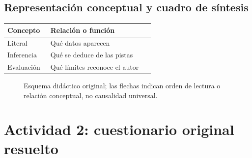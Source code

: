 \subsection{Representación conceptual y cuadro de síntesis}
\begin{longtable}{p{0.27\linewidth}p{0.65\linewidth}}
\toprule Concepto & Relación o función\\\midrule
Literal & Qué datos aparecen\\
Inferencia & Qué se deduce de las pistas\\
Evaluación & Qué límites reconoce el autor\\
\bottomrule
\end{longtable}
\begin{figure}[htbp]
\centering
{}
\caption{Esquema didáctico original; las flechas indican orden de lectura o relación conceptual, no causalidad universal.}
\end{figure}
\clearpage\section{Actividad 2: cuestionario original resuelto}

